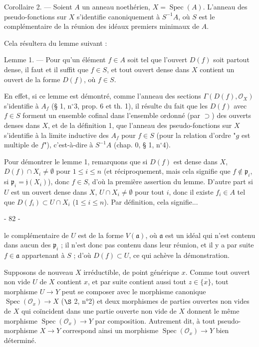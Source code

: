 \noindent Corollaire 2. — Soient $A$ un anneau noethérien, $X = \operatorname{Spec}(A)$. L'anneau des pseudo-fonctions sur $X$ s'identifie canoniquement à $S^{-1}A$, où $S$ est le complémentaire de la réunion des idéaux premiers minimaux de $A$.

\noindent Cela résultera du lemme suivant :

\noindent Lemme 1. — Pour qu'un élément $f \in A$ soit tel que l'ouvert $D(f)$ soit partout dense, il faut et il suffit que $f \in S$, et tout ouvert dense dans $X$ contient un ouvert de la forme $D(f)$, où $f \in S$.

\noindent En effet, si ce lemme est démontré, comme l'anneau des sections $\Gamma(D(f), \mathcal{O}_X)$ s'identifie à $A_f$ (§ 1, n$^\circ$3, prop. 6 et th. 1), il résulte du fait que les $D(f)$ avec $f \in S$ forment un ensemble cofinal dans l'ensemble ordonné (par $\supset$) des ouverts denses dans $X$, et de la définition 1, que l'anneau des pseudo-fonctions sur $X$ s'identifie à la limite inductive des $A_f$ pour $f \in S$ (pour la relation d'ordre "$g$ est multiple de $f$"), c'est-à-dire à $S^{-1}A$ (chap. 0, § 1, n$^\circ$4).

\noindent Pour démontrer le lemme 1, remarquons que si $D(f)$ est dense dans $X$, $D(f) \cap X_i \neq \emptyset$ pour $1 \leq i \leq n$ (et réciproquement, mais cela signifie que $f \notin \mathfrak{p}_i$, si $\mathfrak{p}_i = \mathfrak{j}(X_i)$), donc $f \in S$, d'où la première assertion du lemme. D'autre part si $U$ est un ouvert dense dans $X$, $U \cap X_i \neq \emptyset$ pour tout $i$, donc il existe $f_i \in A$ tel que $D(f_i) \subset U \cap X_i$ ($1 \leq i \leq n$). Par définition, cela signifie...

\newpage


- 82 -

le complémentaire de $U$ est de la forme $V(\mathfrak{a})$, où $\mathfrak{a}$ est un idéal qui n'est contenu dans aucun des $\mathfrak{p}_i$ ; il n'est donc pas contenu dans leur réunion, et il y a par suite $f \in \mathfrak{a}$ appartenant à $S$ ; d'où $D(f) \subset U$, ce qui achève la démonstration.

Supposons de nouveau $X$ irréductible, de point générique $x$. Comme tout ouvert non vide $U$ de $X$ contient $x$, et par suite contient aussi tout $z \in \overline{\{x\}}$, tout morphisme $U \to Y$ peut se composer avec le morphisme canonique $\operatorname{Spec}(\mathcal{O}_x) \to X$ ($\S$ 2, n°2) et deux morphismes de parties ouvertes non vides de $X$ qui coïncident dans une partie ouverte non vide de $X$ donnent le même morphisme $\operatorname{Spec}(\mathcal{O}_x) \to Y$ par composition. Autrement dit, à tout pseudo-morphisme $X \to Y$ correspond ainsi un morphisme $\operatorname{Spec}(\mathcal{O}_x) \to Y$ bien déterminé.

